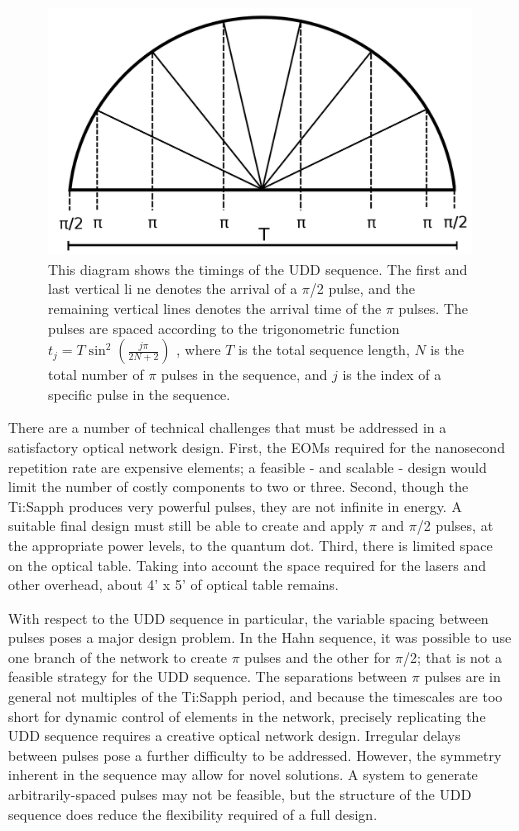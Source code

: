 \documentclass[pdftex,12pt,a4paper]{article}
\begin{document}
\begin{figure}[H]
  \centering
    \includegraphics[width=.75\textwidth]{timing.png}
  \caption{This diagram shows the timings of the UDD sequence. The first and last vertical li	ne denotes the arrival of a $\pi$/2 pulse, and the remaining vertical lines denotes the arrival time of the $\pi$ pulses. The pulses are spaced according to the trigonometric function $t_j=T \sin^2\left(\frac{j \pi} {2N+2}\right)$ \cite{Uhrig}, where $T$ is the total sequence length, $N$ is the total number of $\pi$ pulses in the sequence, and $j$ is the index of a specific pulse in the sequence.}
  \label{fig:timing}
\end{figure}

There are a number of technical challenges that must be addressed in a satisfactory optical network design. First, the EOMs required for the nanosecond repetition rate are expensive elements; a feasible - and scalable - design would limit the number of costly components to two or three. Second, though the Ti:Sapph produces very powerful pulses, they are not infinite in energy. A suitable final design must still be able to create and apply $\pi$ and $\pi$/2 pulses, at the appropriate power levels, to the quantum dot. Third, there is limited space on the optical table. Taking into account the space required for the lasers and other overhead, about 4’ x 5’ of optical table remains.

With respect to the UDD sequence in particular, the variable spacing between pulses poses a major design problem. In the Hahn sequence, it was possible to use one branch of the network to create $\pi$ pulses and the other for $\pi$/2; that is not a feasible strategy for the UDD sequence. The separations between $\pi$ pulses are in general not multiples of the Ti:Sapph period, and because the timescales are too short for dynamic control of elements in the network, precisely replicating the UDD sequence requires a creative optical network design. Irregular delays between pulses pose a further difficulty to be addressed. However, the symmetry inherent in the sequence may allow for novel solutions. A system to generate arbitrarily-spaced pulses may not be feasible, but the structure of the UDD sequence does reduce the flexibility required of a full design.
    
\end{document}
